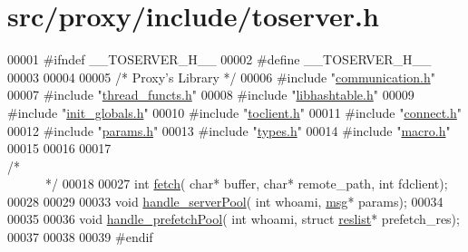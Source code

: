 \hypertarget{toserver_8h_source}{
\section{src/proxy/include/toserver.h}
}

\begin{DoxyCode}
00001 \textcolor{preprocessor}{#ifndef \_\_TOSERVER\_H\_\_}
00002 \textcolor{preprocessor}{}\textcolor{preprocessor}{#define \_\_TOSERVER\_H\_\_}
00003 \textcolor{preprocessor}{}
00004 
00005 \textcolor{comment}{/*      Proxy's Library */}
00006 \textcolor{preprocessor}{#include        "\hyperlink{communication_8h}{communication.h}"}
00007 \textcolor{preprocessor}{#include        "\hyperlink{thread__functs_8h}{thread_functs.h}"}
00008 \textcolor{preprocessor}{#include        "\hyperlink{proxy_2include_2libhashtable_8h}{libhashtable.h}"}
00009 \textcolor{preprocessor}{#include        "\hyperlink{init__globals_8h}{init_globals.h}"}
00010 \textcolor{preprocessor}{#include        "\hyperlink{toclient_8h}{toclient.h}"}
00011 \textcolor{preprocessor}{#include        "\hyperlink{connect_8h}{connect.h}"}
00012 \textcolor{preprocessor}{#include        "\hyperlink{params_8h}{params.h}"}
00013 \textcolor{preprocessor}{#include        "\hyperlink{types_8h}{types.h}"}
00014 \textcolor{preprocessor}{#include        "\hyperlink{macro_8h}{macro.h}"}
00015 
00016 
00017 \textcolor{comment}{/*~~~~~~~~~~~~~~~~~~~~~~~~~~~~~~~~~~~~~~~~~~~~~~~~~~~~~~~~~~~~~~~~~~~~~~~~~~~~*/}
00018 
00027 \textcolor{keywordtype}{int}             \hyperlink{toserver_8h_a011d09dc3c763ec3a26b0706a0e8d173}{fetch}( \textcolor{keywordtype}{char}* buffer, \textcolor{keywordtype}{char}* remote\_path, \textcolor{keywordtype}{int} fdclient);
00028 
00029 
00033 \textcolor{keywordtype}{void}    \hyperlink{toserver_8h_afaf61404515e765b53f67004ae097034}{handle_serverPool}( \textcolor{keywordtype}{int} whoami, \hyperlink{structmsg}{msg}* params);
00034 
00035 
00036 \textcolor{keywordtype}{void}    \hyperlink{toserver_8h_a631a452041188727281fda66f1db8dee}{handle_prefetchPool}( \textcolor{keywordtype}{int} whoami, \textcolor{keyword}{struct} \hyperlink{structreslist}{reslist}* prefetch\_res);
00037 
00038 
00039 \textcolor{preprocessor}{#endif}
\end{DoxyCode}
